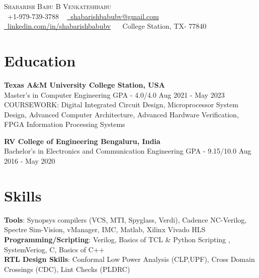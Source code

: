 \documentclass[letterpaper,11pt]{article}
\begin{document}
\begin{center}
    {\Huge \scshape Shabarish Babu B Venkateshbabu} \\ \vspace{3 pt}
    \small \raisebox{-0.1\height}\faPhone\ +1-979-739-3788 ~ \href{mailto:shabarishbabubv@gmail.com}{\raisebox{-0.2\height}\faEnvelope\ {shabarishbabubv@gmail.com}} ~ 
    \href{https://linkedin.com/in/shabarishbabubv/}{\raisebox{-0.2\height}\faLinkedin\ {linkedin.com/in/shabarishbabubv}}  ~
    {\raisebox{-0.2\height}\faHome\ {College Station, TX- 77840}}
    \vspace{-8pt}
\end{center}

\vspace{0.1 pt}
\section{Education}
    \textbf{Texas A\&M University \hspace{\fill} College Station, USA} \\
    Master's in Computer Engineering GPA - 4.0/4.0 \hspace{\fill} Aug 2021 - May 2023 \\
    COURSEWORK: Digital Integrated Circuit Design, Microprocessor System Design, Advanced Computer Architecture, Advanced Hardware Verification, FPGA Information Processing Systems
    \medskip
    
    \textbf{RV College of Engineering \hspace{\fill} Bengaluru, India} \\
    Bachelor's in Electronics and Communication Engineering GPA - 9.15/10.0 \hspace{\fill} Aug 2016 - May 2020 \\
\vspace{-1 pt}

\section{Skills}
 \begin{itemize}[leftmargin=0in, label={}]
    \small{\item{
     \textbf{Tools}{: Synopsys compilers (VCS, MTI, Spyglass, Verdi), Cadence NC-Verilog, Spectre Sim-Vision, vManager, IMC, Matlab, Xilinx Vivado HLS } \\
     \textbf{Programming/Scripting}{: Verilog, Basics of TCL \& Python Scripting , SystemVeriog, C, Basics of C++} \\
     \textbf{RTL Design Skills}{: Conformal Low Power Analysis (CLP,UPF), Cross Domain Crossings (CDC), Lint Checks (PLDRC)} \\
    }}
 \end{itemize}
\vspace{-12pt}
\end{document}
